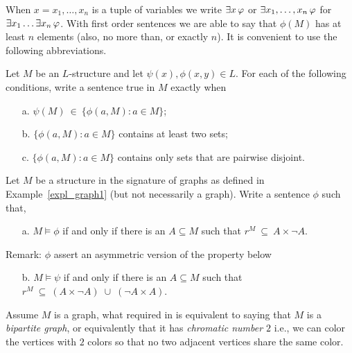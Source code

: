When $x=x_1,\dots,x_n$ is a tuple of variables we write \emph{$\exists x\,\varphi$\/} or \emph{$\exists x_1,\dots,x_n\,\varphi$\/} for $\exists x_1\dots\exists x_n\,\varphi$.  With first order sentences we are able to say that $\phi(M)$ has at least $n$ elements (also, no more than, or exactly $n$). It is convenient to use the following abbreviations.


\bigskip

\smallskip

\begin{exercise}
Let $M$ be an $L$-structure and let $\psi(x), \phi(x,y)\in L$. For each of the following conditions, write a sentence true in $M$ exactly when
\begin{itemize}
\item[a.] $\psi(M)\ \in\ \big\{\phi(a,M): a\in M\big\}$;
\item[b.] $\big\{\phi(a,M): a\in M\big\}$ contains at least two sets;
\item[c.] $\big\{\phi(a,M): a\in M\big\}$ contains only sets that are pairwise disjoint.\QED
\end{itemize}
\end{exercise}

\begin{exercise}\label{ex_grafo_bipartito}
Let $M$ be a structure in the signature of graphs as defined in Example~\ref{expl_graph1} (but not necessarily a graph). Write a sentence $\phi$ such that, 
\begin{itemize} 
\item[a.] $M\models\phi$ if and only if there is an $A\subseteq M$ such that $r^M\ \subseteq\ A\times\neg A$.
\end{itemize}
Remark: $\phi$ assert an asymmetric version of the property below
\begin{itemize} 
\item[b.] $M\models\psi$ if and only if there is an $A\subseteq M$ such that $r^M\ \subseteq\ (A\times \neg A)\;\cup\;(\neg A\times A)$.
\end{itemize}
Assume $M$ is a graph, what required in  is equivalent to saying that $M$ is a \textit{bipartite graph}, or equivalently that it has \textit{chromatic number $2$\/} i.e., we can color the vertices with $2$ colors so that no two adjacent vertices share the same color.\QED
\end{exercise}


